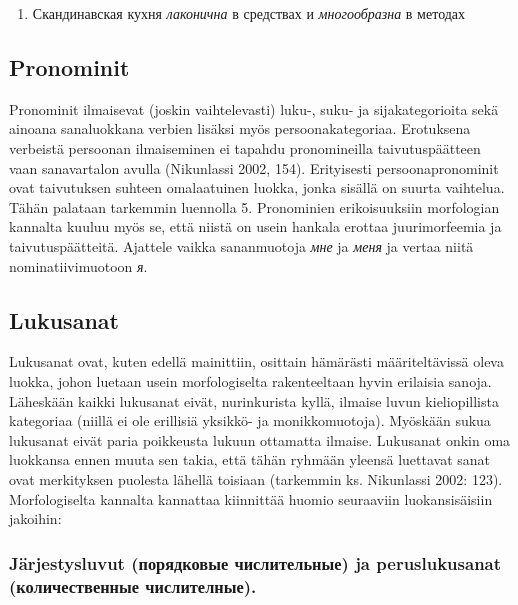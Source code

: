 \documentclass[]{scrreprt}
\providecommand{\tightlist}{%
  \setlength{\itemsep}{0pt}\setlength{\parskip}{0pt}}
\begin{document}
\begin{enumerate}
\def\labelenumi{(\arabic{enumi})}
\setcounter{enumi}{5}
\tightlist
\item
  Скандинавская кухня \emph{лаконична} в средствах и \emph{многообразна}
  в методах
\end{enumerate}

\subsection{Pronominit}\label{pronominit}

Pronominit ilmaisevat (joskin vaihtelevasti) luku-, suku- ja
sijakategorioita sekä ainoana sanaluokkana verbien lisäksi myös
persoonakategoriaa. Erotuksena verbeistä persoonan ilmaiseminen ei
tapahdu pronomineilla taivutuspäätteen vaan sanavartalon avulla
(Nikunlassi 2002, 154). Erityisesti persoonapronominit ovat taivutuksen
suhteen omalaatuinen luokka, jonka sisällä on suurta vaihtelua. Tähän
palataan tarkemmin luennolla 5. Pronominien erikoisuuksiin morfologian
kannalta kuuluu myös se, että niistä on usein hankala erottaa
juurimorfeemia ja taivutuspäätteitä. Ajattele vaikka sananmuotoja
\emph{мне} ja \emph{меня} ja vertaa niitä nominatiivimuotoon \emph{я}.

\subsection{Lukusanat}\label{lukusanat}

Lukusanat ovat, kuten edellä mainittiin, osittain hämärästi
määriteltävissä oleva luokka, johon luetaan usein morfologiselta
rakenteeltaan hyvin erilaisia sanoja. Läheskään kaikki lukusanat eivät,
nurinkurista kyllä, ilmaise luvun kieliopillista kategoriaa (niillä ei
ole erillisiä yksikkö- ja monikkomuotoja). Myöskään sukua lukusanat
eivät paria poikkeusta lukuun ottamatta ilmaise. Lukusanat onkin oma
luokkansa ennen muuta sen takia, että tähän ryhmään yleensä luettavat
sanat ovat merkityksen puolesta lähellä toisiaan (tarkemmin ks.
Nikunlassi 2002: 123). Morfologiselta kannalta kannattaa kiinnittää
huomio seuraaviin luokansisäisiin jakoihin:

\subsubsection{Järjestysluvut (порядковые числительные) ja peruslukusanat
(количественные
числителные).}\label{juxe4rjestysluvut-ux43fux43eux440ux44fux434ux43aux43eux432ux44bux435-ux447ux438ux441ux43bux438ux442ux435ux43bux44cux43dux44bux435-ja-peruslukusanat-ux43aux43eux43bux438ux447ux435ux441ux442ux432ux435ux43dux43dux44bux435-ux447ux438ux441ux43bux438ux442ux435ux43bux43dux44bux435.}
\end{document}
